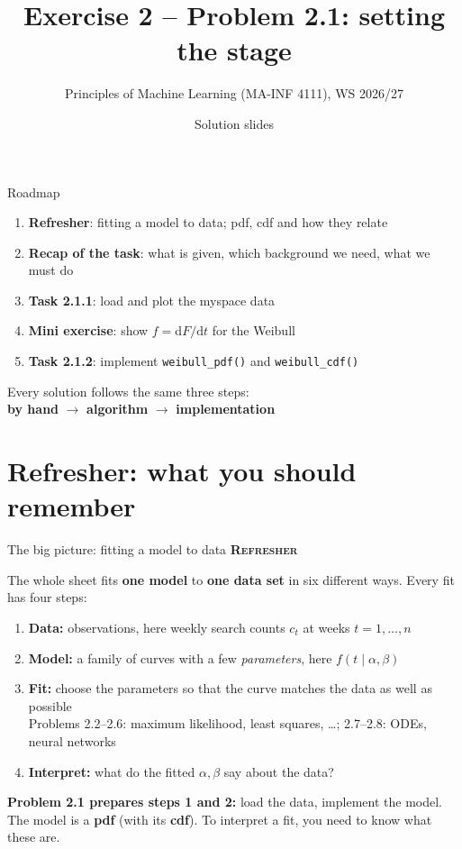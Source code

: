 \documentclass[aspectratio=169,11pt]{beamer}
\title{Exercise 2 -- Problem 2.1: setting the stage}
\subtitle{Principles of Machine Learning (MA-INF 4111), WS 2026/27}
\date{Solution slides}
\newcommand{\stage}[2]{{\color{#1}\bfseries\small\textsc{#2}}\par\smallskip}
\newcommand{\Refresh}{\stage{given}{Refresher}}
\begin{document}
\maketitle

\begin{frame}{Roadmap}
\begin{enumerate}
\item \textbf{Refresher}: fitting a model to data; pdf, cdf and how they relate
\item \textbf{Recap of the task}: what is given, which background we need, what we must do
\item \textbf{Task 2.1.1}: load and plot the myspace data
\item \textbf{Mini exercise}: show $f=\mathrm dF/\mathrm dt$ for the Weibull
\item \textbf{Task 2.1.2}: implement \texttt{weibull\_pdf()} and \texttt{weibull\_cdf()}
\end{enumerate}
\bigskip
Every solution follows the same three steps:\\[3pt]
\textcolor{hand}{\textbf{by hand}} \;$\to$\; \textcolor{algo}{\textbf{algorithm}} \;$\to$\; \textcolor{impl}{\textbf{implementation}}
\end{frame}

\section{Refresher: what you should remember}

\begin{frame}{The big picture: fitting a model to data}\small
\Refresh
The whole sheet fits \textbf{one model} to \textbf{one data set} in six different ways. Every fit has four steps:
\begin{enumerate}
\item \textbf{Data:} observations, here weekly search counts $c_t$ at weeks $t=1,\dots,n$
\item \textbf{Model:} a family of curves with a few \emph{parameters}, here $f(t\mid\alpha,\beta)$
\item \textbf{Fit:} choose the parameters so that the curve matches the data as well as possible\\
\quad Problems 2.2--2.6: maximum likelihood, least squares, \dots; 2.7--2.8: ODEs, neural networks
\item \textbf{Interpret:} what do the fitted $\alpha,\beta$ say about the data?
\end{enumerate}
\medskip
\textbf{Problem 2.1 prepares steps 1 and 2:} load the data, implement the model.\\
The model is a \textbf{pdf} (with its \textbf{cdf}). To interpret a fit, you need to know what these are.
\end{frame}
\end{document}
